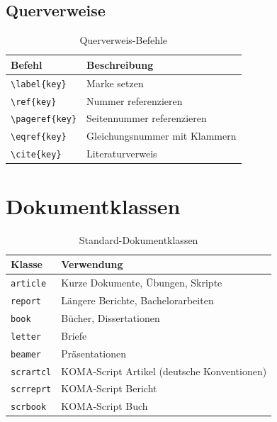 \section{Querverweise}

\begin{table}[htbp]
    \centering
    \caption{Querverweis-Befehle}
    \label{tab:befehle-referenzen}
    \begin{tabular}{lp{7cm}}
        \toprule
        Befehl & Beschreibung \\
        \midrule
        \texttt{\textbackslash label\{key\}} & Marke setzen \\
        \texttt{\textbackslash ref\{key\}} & Nummer referenzieren \\
        \texttt{\textbackslash pageref\{key\}} & Seitennummer referenzieren \\
        \texttt{\textbackslash eqref\{key\}} & Gleichungsnummer mit Klammern \\
        \texttt{\textbackslash cite\{key\}} & Literaturverweis \\
        \bottomrule
    \end{tabular}
\end{table}

\chapter{Dokumentklassen}
\label{anhang:klassen}

\begin{table}[htbp]
    \centering
    \caption{Standard-Dokumentklassen}
    \label{tab:klassen}
    \begin{tabular}{lp{8cm}}
        \toprule
        Klasse & Verwendung \\
        \midrule
        \texttt{article} & Kurze Dokumente, Übungen, Skripte \\
        \texttt{report} & Längere Berichte, Bachelorarbeiten \\
        \texttt{book} & Bücher, Dissertationen \\
        \texttt{letter} & Briefe \\
        \texttt{beamer} & Präsentationen \\
        \texttt{scrartcl} & KOMA-Script Artikel (deutsche Konventionen) \\
        \texttt{scrreprt} & KOMA-Script Bericht \\
        \texttt{scrbook} & KOMA-Script Buch \\
        \bottomrule
    \end{tabular}
\end{table}

